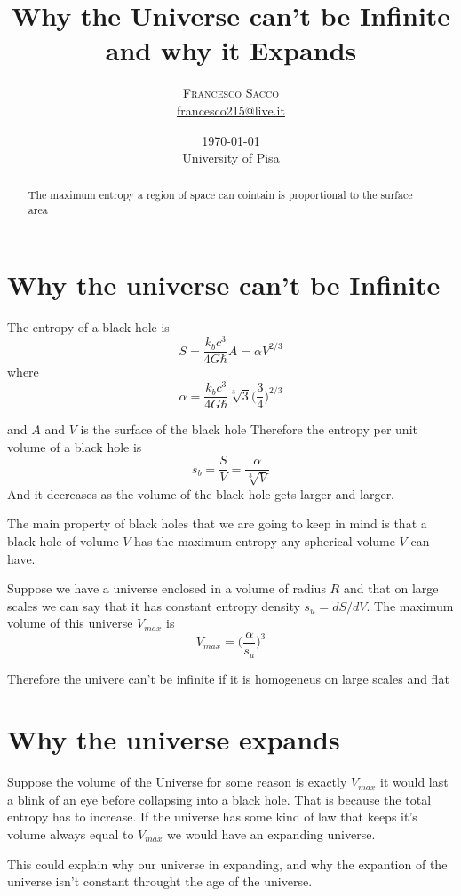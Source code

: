 \documentclass[10pt,twoside]{article}
\title{Why the Universe can't be Infinite and why it Expands} %
\author{%
\textsc{Francesco Sacco}\\[1ex] %
\normalsize \href{mailto:francesco215@live.it}{francesco215@live.it} %
}
\date{
    \small\today\\
    \small{\small{University of Pisa}}} %
\begin{document}
\maketitle

\begin{abstract}
The maximum entropy a region of space can cointain is proportional to the surface area
\end{abstract}
\vspace{0.2cm}
\begin{multicols}{2}

\section{Why the universe can't be Infinite}
	The entropy of a black hole is
	\begin{equation}
		S=\frac{k_b c^3}{4G\hbar} A=\alpha V^{2/3}
	\end{equation}
	where
	\begin{equation}
		\alpha=\frac{k_b c^3}{4G\hbar} \sqrt[3]{3}\bigg(\frac34\bigg)^{2/3}
	\end{equation}

	and $A$ and $V$ is the surface of the black hole\newline
	Therefore the entropy per unit volume of a black hole is
	\begin{equation}
		s_b=\frac SV=\frac{\alpha}{\sqrt[3]{V}}
	\end{equation}
	And it decreases as the volume of the black hole gets larger and larger.


	The main property of black holes that we are going to keep in mind is that a black hole of volume $V$ has the maximum entropy any spherical volume $V$ can have.


	Suppose we have a universe enclosed in a volume of radius $R$ and that on large scales we can say that it has constant entropy density $s_u=dS/dV$.\newline
	The maximum volume of this universe $V_{max}$ is
	\begin{equation}
		V_{max}= \bigg(\frac\alpha {s_u}\bigg)^3
	\end{equation}

	Therefore the univere can't be infinite if it is homogeneus on large scales and flat
\section{Why the universe expands}
	Suppose the volume of the Universe for some reason is exactly $V_{max}$ it would last a blink of an eye before collapsing into a black hole. That is because the total entropy has to increase.
	If the universe has some kind of law that keeps it's volume always equal to $V_{max}$ we would have an expanding universe.

	This could explain why our universe in expanding, and why the expantion of the universe isn't constant throught the age of the universe.

\end{multicols}
\end{document}
